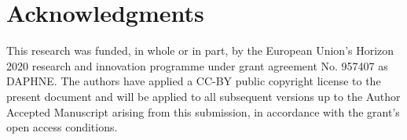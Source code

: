 \documentclass[sigconf,natbib=false]{acmart}
\newcommand{\eg}{\emph{e.g.,}}
\newcommand{\aeval}{AE}
\newcommand{\todo}[1]{{\color{red}{TODO: #1}}}
\begin{document}
% 
% 
% 
% 

\section*{Acknowledgments}

This research was funded, in whole or in part, by the European Union’s Horizon 2020 research and innovation programme under grant agreement No. 957407 as DAPHNE.
The authors have applied a CC-BY public copyright license to the present document and will be applied to all subsequent versions up to the Author Accepted Manuscript arising from this submission, in accordance with the grant’s open access conditions.

\newpage


%
%
\printbibliography
\end{document}
